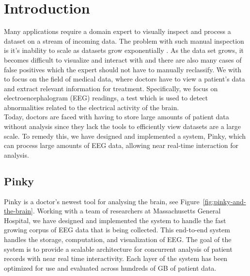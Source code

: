 \chapter{Introduction}\label{intro-ch}

Many applications require a domain expert to visually inspect and process a
dataset on a stream of incoming data. The problem with such manual inspection
is it's inability to scale as datasets grow exponentially \cite{exp-growth}. As
the data set grows, it becomes difficult to visualize and interact with
\cite{immens} and there are also many cases of false positives which the expert
should not have to manually reclassify. We with to focus on the field of
medical data, where doctors have to view a patient's data and extract relevant
information for treatment. Specifically, we focus on electroencephalogram (EEG)
readings, a test which is used to detect abnormalities related to the
electrical activity of the brain. \\

Today, doctors are faced with having to store large amounts of patient data
without analysis since they lack the tools to efficiently view datasets are a
large scale. To remedy this, we have designed and implemented a system, Pinky,
which can process large amounts of EEG data, allowing near real-time
interaction for analysis.


\section{Pinky}

Pinky is a doctor's newest tool for analysing the brain, see
Figure~\ref{fig:pinky-and-the-brain}. Working with a team of researchers at
Massachusetts General Hospital, we have designed and implemented the system to
handle the fast growing corpus of EEG data that is being collected. This
end-to-end system handles the storage, computation, and visualization of EEG.
The goal of the system is to provide a scalable architecture for concurrent
analysis of patient records with near real time interactivity. Each layer of
the system has been optimized for use and evaluated across hundreds of GB of
patient data. \\

